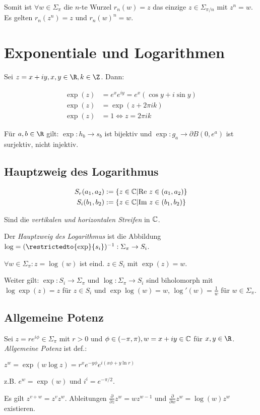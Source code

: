 Somit ist $\forall w \in \Sigma_\pi$ die $n$-te Wurzel $r_n(w) = z$ das einzige $z \in \Sigma_{\pi/n}$ mit $z^n = w$. Es gelten $r_n(z^n) = z$ und $r_n(w)^n = w$.

\section*{Exponentiale und Logarithmen}

Sei $z = x + iy, x, y \in \R, k \in \Z$. Dann:

\vspace*{-4mm}
\begin{align*}
	\exp(z) &= e^x e^{iy} = e^x(\cos y + i \sin y) \\
	\exp(z) &= \exp(z+2\pi ik) \\
	\exp(z) &= 1 \iff z=2\pi i k
\end{align*}

Für $a, b \in \R$ gilt: $\exp : h_b \to s_b$ ist bijektiv und $\exp : g_a \to \partial B(0,e^a)$ ist surjektiv, nicht injektiv.

\subsection*{Hauptzweig des Logarithmus}

\vspace*{-4mm}
\begin{align*}
	S_r(a_1,a_2) &:= \{ z \in \mathbb{C} | \text{Re } z \in (a_1,a_2) \} \\
	S_i(b_1,b_2) &:= \{ z \in \mathbb{C} | \text{Im } z \in (b_1,b_2) \}
\end{align*}
\vspace*{-6mm}

Sind die \emph{vertikalen und horizontalen Streifen} in $\mathbb{C}$.

\spacing

Der \emph{Hauptzweig des Logarithmus} ist die Abbildung $\log = (\restrictedto{\exp}{s_i})^{-1} : \Sigma_\pi \to S_i$.

$\forall w \in \Sigma_\pi : z = \log(w)$ ist eind. $z \in S_i$ mit $\exp(z) = w$.

Weiter gilt: $\exp : S_i \to \Sigma_\pi$ und $\log : \Sigma_\pi \to S_i$ sind biholomorph mit $\log\exp(z) = z$ für $z \in S_i$ und $\exp\log(w) = w$, $\log'(w) = \frac{1}{w}$ für $w \in \Sigma_\pi$.

\subsection*{Allgemeine Potenz}

Sei $z = re^{i\phi} \in \Sigma_\pi$ mit $r > 0$ und $\phi \in (-\pi,\pi), w = x + iy \in \mathbb{C}$ für $x, y \in \R$. \emph{Allgemeine Potenz} ist def.:

$z^w = \exp(w \log z) = r^x e^{-y\phi} e^{i(x\phi + y \ln r)}$

z.B. $e^w = \exp(w)$ und $i^i = e^{-\pi/2}$.

\spacing

Es gilt $z^{v+w} = z^v z^w$. Ableitungen $\frac{\partial}{\partial z} z^w = wz^{w-1}$ und $\frac{\partial}{\partial w} z^w = \log(w)z^w$ existieren.


